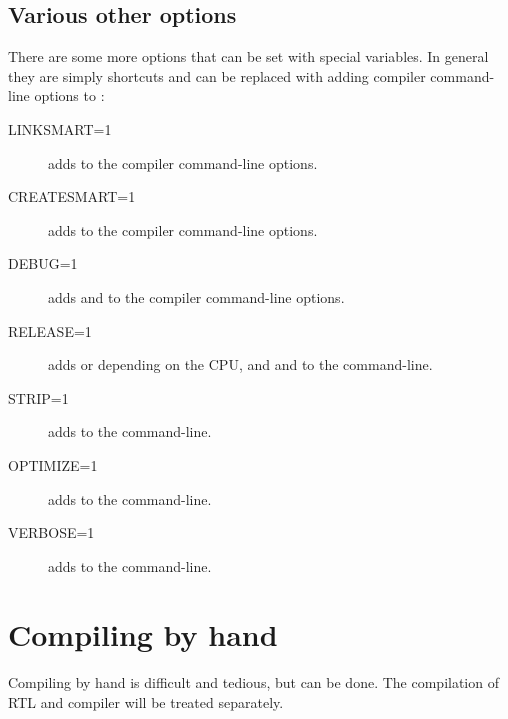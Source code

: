 \subsection{Various other options}
There are some more options that can be set with special variables. 
In general they are simply shortcuts and can be replaced with adding
compiler command-line options to :
\begin{description}
\item[LINKSMART=1] adds  to the compiler command-line options.
\item[CREATESMART=1] adds  to the compiler command-line options.
\item[DEBUG=1] adds  and  to the compiler command-line options.
\item[RELEASE=1] adds  or  depending on the CPU, and
 and  to the command-line.
\item[STRIP=1] adds  to the command-line.
\item[OPTIMIZE=1] adds  to the command-line.
\item[VERBOSE=1] adds  to the command-line.
\end{description}

\section{Compiling by hand}

Compiling by hand is difficult and tedious, but can be done. The 
compilation of RTL and compiler will be treated separately.

